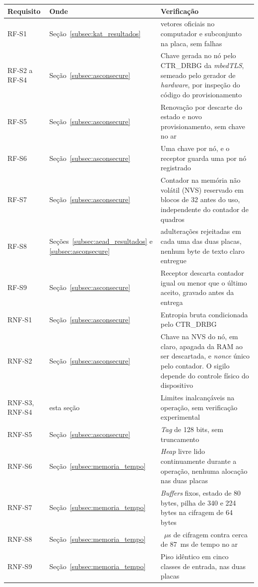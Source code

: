 \begin{quadro}[htb]
\centering
\caption{Rastreabilidade dos requisitos de segurança}
\label{qua:rastreabilidade_ascon}
\small
\begin{tabular}{lp{}>{\raggedright\arraybackslash}p{}}
\hline
\textbf{Requisito} & \textbf{Onde} & \textbf{Verificação} \\
\hline
RF-S1 & Seção~\ref{subsec:kat_resultados} & 1.089 vetores oficiais no computador e subconjunto na placa, sem falhas \\
RF-S2 a RF-S4 & Seção~\ref{subsec:asconsecure} & Chave gerada no nó pelo CTR\_DRBG da \textit{mbedTLS}, semeado pelo gerador de \textit{hardware}, por inspeção do código do provisionamento \\
RF-S5 & Seção~\ref{subsec:asconsecure} & Renovação por descarte do estado e novo provisionamento, sem chave no ar \\
RF-S6 & Seção~\ref{subsec:asconsecure} & Uma chave por nó, e o receptor guarda uma por nó registrado \\
RF-S7 & Seção~\ref{subsec:asconsecure} & Contador na memória não volátil (NVS) reservado em blocos de 32 antes do uso, independente do contador de quadros \\
RF-S8 & Seções~\ref{subsec:aead_resultados} e \ref{subsec:asconsecure} & 4.907 adulterações rejeitadas em cada uma das duas placas, nenhum byte de texto claro entregue \\
RF-S9 & Seção~\ref{subsec:asconsecure} & Receptor descarta contador igual ou menor que o último aceito, gravado antes da entrega \\
RNF-S1 & Seção~\ref{subsec:asconsecure} & Entropia bruta condicionada pelo CTR\_DRBG \\
RNF-S2 & Seção~\ref{subsec:asconsecure} & Chave na NVS do nó, em claro, apagada da RAM ao ser descartada, e \textit{nonce} único pelo contador. O sigilo depende do controle físico do dispositivo \\
RNF-S3, RNF-S4 & esta seção & Limites inalcançáveis na operação, sem verificação experimental \\
RNF-S5 & Seção~\ref{subsec:asconsecure} & \textit{Tag} de 128 bits, sem truncamento \\
RNF-S6 & Seção~\ref{subsec:memoria_tempo} & \textit{Heap} livre lido continuamente durante a operação, nenhuma alocação nas duas placas \\
RNF-S7 & Seção~\ref{subsec:memoria_tempo} & \textit{Buffers} fixos, estado de 80 bytes, pilha de 340 e 224 bytes na cifragem de 64 bytes \\
RNF-S8 & Seção~\ref{subsec:memoria_tempo} & 27~$\mu$s de cifragem contra cerca de 87~ms de tempo no ar \\
RNF-S9 & Seção~\ref{subsec:memoria_tempo} & Piso idêntico em cinco classes de entrada, nas duas placas \\
\hline
\end{tabular}
\end{quadro}

